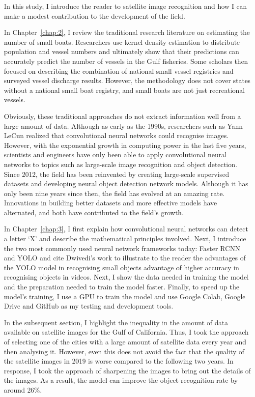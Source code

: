 
In this study, I introduce the reader to satellite image recognition and how I can make a modest contribution to the development of the field.

In Chapter~\ref{chap:2}, I review the traditional research literature on estimating the number of small boats. Researchers use kernel density estimation to distribute population and vessel numbers and ultimately show that their predictions can accurately predict the number of vessels in the Gulf fisheries. Some scholars then focused on describing the combination of national small vessel registries and surveyed vessel discharge results. However, the methodology does not cover states without a national small boat registry, and small boats are not just recreational vessels.

Obviously, these traditional approaches do not extract information well from a large amount of data. Although as early as the 1990s, researchers such as Yann LeCun realized that convolutional neural networks could recognise images. However, with the exponential growth in computing power in the last five years, scientists and engineers have only been able to apply convolutional neural networks to topics such as large-scale image recognition and object detection. Since 2012, the field has been reinvented by creating large-scale supervised datasets and developing neural object detection network models. Although it has only been nine years since then, the field has evolved at an amazing rate. Innovations in building better datasets and more effective models have alternated, and both have contributed to the field's growth.

In Chapter~\ref{chap:3}, I first explain how convolutional neural networks can detect a letter `X' and describe the mathematical principles involved. Next, I introduce the two most commonly used neural network frameworks today: Faster RCNN and YOLO and cite Dwivedi's work to illustrate to the reader the advantages of the YOLO model in recognising small objects advantage of higher accuracy in recognising objects in videos. Next, I show the data needed in training the model and the preparation needed to train the model faster. Finally, to speed up the model's training, I use a GPU to train the model and use Google Colab, Google Drive and GitHub as my testing and development tools.


In the subsequent section, I highlight the inequality in the amount of data available on satellite images for the Gulf of California. Thus, I took the approach of selecting one of the cities with a large amount of satellite data every year and then analysing it. However, even this does not avoid the fact that the quality of the satellite images in 2019 is worse compared to the following two years. In response, I took the approach of sharpening the images to bring out the details of the images. As a result, the model can improve the object recognition rate by around 26\%.

